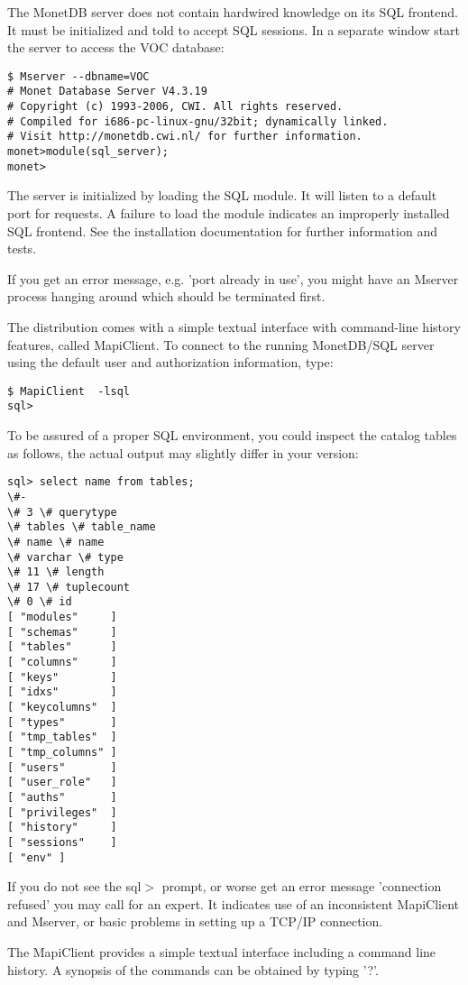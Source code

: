 \documentclass[10pt,twocolumn,fleqn]{article}
\begin{document}
The MonetDB server does not contain hardwired knowledge on its SQL frontend.
It must be initialized and told to accept SQL sessions. In a separate window
start the server to access the VOC database:

{\footnotesize
\begin{verbatim}
$ Mserver --dbname=VOC 
# Monet Database Server V4.3.19
# Copyright (c) 1993-2006, CWI. All rights reserved.
# Compiled for i686-pc-linux-gnu/32bit; dynamically linked.
# Visit http://monetdb.cwi.nl/ for further information.
monet>module(sql_server);
monet>
\end{verbatim}
}

The server is initialized by loading the SQL module. It will listen
to a default port for requests.
A failure to load the module indicates an improperly installed SQL
frontend. See the installation documentation for further information and
tests.

If you get an error message, e.g. 'port already in use', you might have 
an Mserver process hanging around which should be terminated first.

The distribution comes with a simple textual interface with
command-line history features, called MapiClient.
To connect to the running MonetDB/SQL server using the
default user and authorization information, type:

\begin{verbatim}
$ MapiClient  -lsql 
sql>
\end{verbatim}
To be assured of a proper SQL environment, you could inspect the catalog
tables as follows, the actual output may slightly differ in your version:
\begin{verbatim}
sql> select name from tables;
\#-
\# 3 \# querytype
\# tables \# table_name
\# name \# name
\# varchar \# type
\# 11 \# length
\# 17 \# tuplecount
\# 0 \# id
[ "modules"     ]
[ "schemas"     ]
[ "tables"      ]
[ "columns"     ]
[ "keys"        ]
[ "idxs"        ]
[ "keycolumns"  ]
[ "types"       ]
[ "tmp_tables"  ]
[ "tmp_columns" ]
[ "users"       ]
[ "user_role"   ]
[ "auths"       ]
[ "privileges"  ]
[ "history"     ]
[ "sessions"    ]
[ "env" ]
\end{verbatim}

If you do not see the sql$>$ prompt, or worse get an error
message 'connection refused' you may call for an expert.
It indicates use of an inconsistent MapiClient and Mserver,
or basic problems in setting up a TCP/IP connection.

The MapiClient provides a simple textual interface including
a command line history. A synopsis of the commands can be obtained
by typing '?'.
\end{document}
